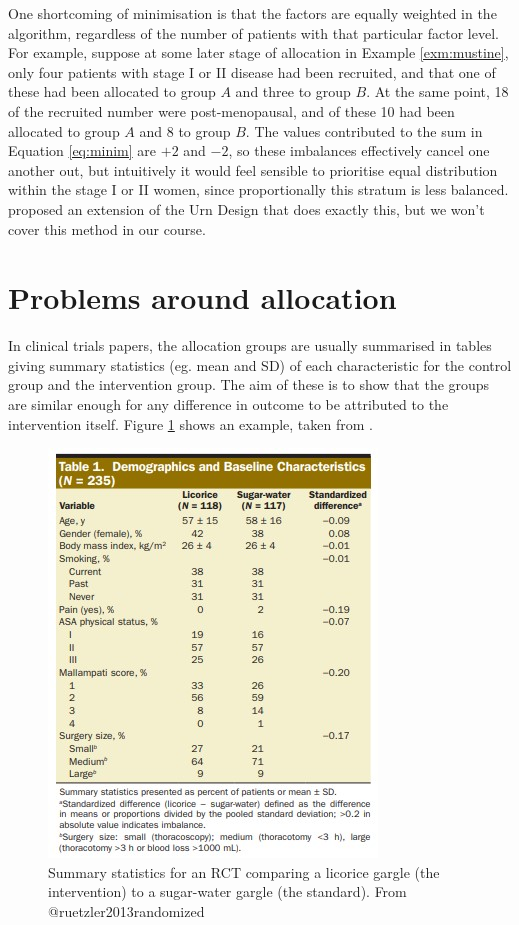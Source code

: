 \documentclass[
  openany]{book}
\theoremstyle{definition}
\theoremstyle{definition}
\theoremstyle{definition}
\theoremstyle{definition}
\theoremstyle{remark}
\begin{document}
One shortcoming of minimisation is that the factors are equally weighted in the algorithm, regardless of the number of patients with that particular factor level. For example, suppose at some later stage of allocation in Example \ref{exm:mustine}, only four patients with stage I or II disease had been recruited, and that one of these had been allocated to group \(A\) and three to group \(B\). At the same point, 18 of the recruited number were post-menopausal, and of these 10 had been allocated to group \(A\) and 8 to group \(B\). The values contributed to the sum in Equation \eqref{eq:minim} are \(+2\) and \(-2\), so these imbalances effectively cancel one another out, but intuitively it would feel sensible to prioritise equal distribution within the stage I or II women, since proportionally this stratum is less balanced. \citet{wei1978application} proposed an extension of the Urn Design that does exactly this, but we won't cover this method in our course.

\hypertarget{problems-around-allocation}{%
\section{Problems around allocation}\label{problems-around-allocation}}

In clinical trials papers, the allocation groups are usually summarised in tables giving summary statistics (eg. mean and SD) of each characteristic for the control group and the intervention group. The aim of these is to show that the groups are similar enough for any difference in outcome to be attributed to the intervention itself. Figure \ref{fig:licorice-participants} shows an example, taken from \citet{ruetzler2013randomized}.

\begin{figure}
\includegraphics[width=0.6\linewidth]{images/licorice} \caption{Summary statistics for an RCT comparing a licorice gargle (the intervention) to a sugar-water gargle (the standard). From @ruetzler2013randomized}\label{fig:licorice-participants}
\end{figure}
\end{document}
